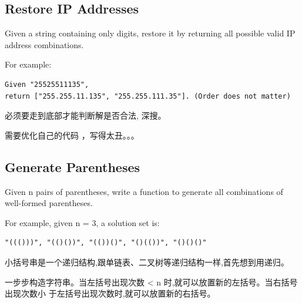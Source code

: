 \documentclass[12pt]{book}
\begin{document}
\subsection{Restore IP Addresses}
\label{sec-11-1-2}
Given a string containing only digits, restore it by returning all possible valid IP address combinations.

For example:
\lstset{language=java,label= ,caption= ,numbers=none}
\begin{lstlisting}
Given "25525511135",
return ["255.255.11.135", "255.255.111.35"]. (Order does not matter)
\end{lstlisting}

必须要走到底部才能判断解是否合法, 深搜。

需要优化自己的代码 ，写得太丑。。。

\subsection{Generate Parentheses}
\label{sec-11-1-3}
Given n pairs of parentheses, write a function to generate all combinations of well-formed parentheses.

For example, given n = 3, a solution set is:
\lstset{language=java,label= ,caption= ,numbers=none}
\begin{lstlisting}
"((()))", "(()())", "(())()", "()(())", "()()()"
\end{lstlisting}

小括号串是一个递归结构,跟单链表、二叉树等递归结构一样,首先想到用递归。

一步步构造字符串。当左括号出现次数 < n 时,就可以放置新的左括号。当右括号出现次数小
于左括号出现次数时,就可以放置新的右括号。
\end{document}
